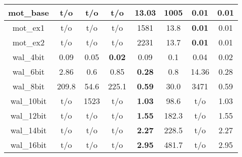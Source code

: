 \begin{table}[t]
\begin{tabular}{|c|c|c|c|c|c|c|c|}
mot\_base   & t/o       & t/o          & t/o                      & 13.03     & 1005       & \textbf{0.01}       & 0.01                 \\ \hline
mot\_ex1 & t/o       & t/o          & t/o                       & 1581   & 13.8         & \textbf{0.01}       & 0.01                 \\ \hline
mot\_ex2 & t/o       & t/o          & t/o                      & 2231   & 13.7         & \textbf{0.01}       & 0.01                 \\ \hline \hline
wal\_4bit  & 0.09      & 0.05         & \textbf{0.02}                    & 0.09      & 0.1          & 0.04       & 0.02                 \\ \hline
wal\_6bit  & 2.86      & 0.6          & 0.85                      & \textbf{0.28}      & 0.8          & 14.36      & 0.28                 \\ \hline
wal\_8bit  & 209.8    & 54.6         & 225.1                    & \textbf{0.59}      & 30.0         & 3471    & 0.59                 \\ \hline
wal\_10bit & t/o       & 1523       & t/o                   & \textbf{1.03}      & 98.6         & t/o        & 1.03                 \\ \hline
wal\_12bit & t/o       & t/o          & t/o                     & \textbf{1.55}      & 182.3        & t/o        & 1.55                 \\ \hline
wal\_14bit & t/o       & t/o          & t/o                        & \textbf{2.27}      & 228.5        & t/o        & 2.27                 \\ \hline
wal\_16bit & t/o       & t/o          & t/o                     & \textbf{2.95}      & 481.7        & t/o        & 2.95                 \\ \hline

\end{tabular}
\end{table} 

